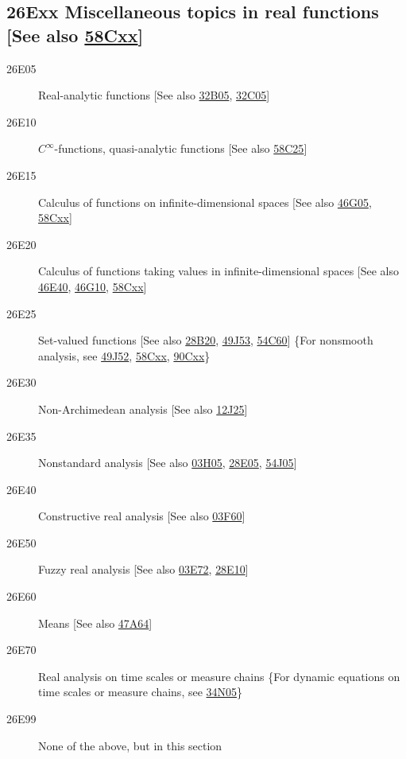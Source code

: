 \subsection*{26Exx  Miscellaneous topics in real functions [See also \hyperref[58Cxx]{58Cxx}] }\label{26Exx}
\begin{description}
\item [26E05]\label{26E05} Real-analytic functions [See also \hyperref[32B05]{32B05}, \hyperref[32C05]{32C05}]
\item [26E10]\label{26E10} $C^\infty$-functions, quasi-analytic functions [See also \hyperref[58C25]{58C25}]
\item [26E15]\label{26E15} Calculus of functions on infinite-dimensional spaces [See also \hyperref[46G05]{46G05}, \hyperref[58Cxx]{58Cxx}]
\item [26E20]\label{26E20} Calculus of functions taking values in infinite-dimensional spaces [See also \hyperref[46E40]{46E40}, \hyperref[46G10]{46G10}, \hyperref[58Cxx]{58Cxx}]
\item [26E25]\label{26E25} Set-valued functions [See also \hyperref[28B20]{28B20}, \hyperref[49J53]{49J53}, \hyperref[54C60]{54C60}] \{For nonsmooth analysis, see \hyperref[49J52]{49J52}, \hyperref[58Cxx]{58Cxx}, \hyperref[90Cxx]{90Cxx}\}
\item [26E30]\label{26E30} Non-Archimedean analysis [See also \hyperref[12J25]{12J25}]
\item [26E35]\label{26E35} Nonstandard analysis [See also \hyperref[03H05]{03H05}, \hyperref[28E05]{28E05}, \hyperref[54J05]{54J05}]
\item [26E40]\label{26E40} Constructive real analysis [See also \hyperref[03F60]{03F60}]
\item [26E50]\label{26E50} Fuzzy real analysis [See also \hyperref[03E72]{03E72}, \hyperref[28E10]{28E10}]
\item [26E60]\label{26E60} Means [See also \hyperref[47A64]{47A64}]
\item [26E70]\label{26E70} Real analysis on time scales or measure chains \{For dynamic equations on time scales or measure chains, see \hyperref[34N05]{34N05}\}
\item [26E99]\label{26E99} None of the above, but in this section
\end{description}
